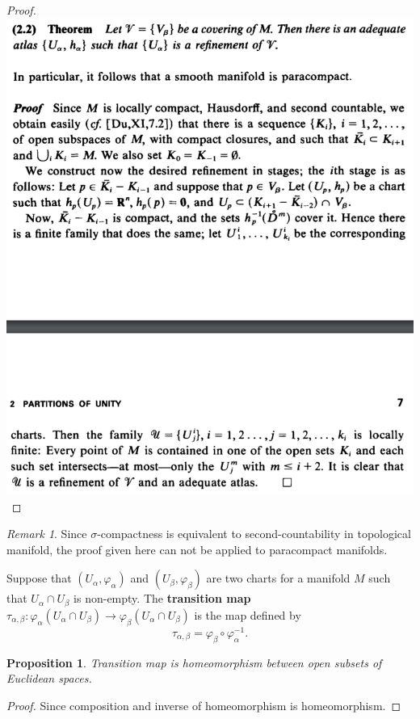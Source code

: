 \documentclass[12pt, letterpaper]{article}
\newtheorem{prop}{Proposition}[section]
\theoremstyle{definition}
\theoremstyle{remark}
\newtheorem*{rem*}{Remark}
\theoremstyle{definition}
\theoremstyle{plain}
\numberwithin{equation}{section}
\begin{document}
\begin{proof}
		\includegraphics[scale=0.65]{adequate_atlas}
	\end{proof}
	\begin{rem*}
		Since $\sigma$-compactness is equivalent to second-countability in topological manifold,
		the proof given here can not be applied to paracompact manifolds.
	\end{rem*}

	
	
	
	\begin{def*}
		Suppose that $(U_{\alpha },\varphi _{\alpha })$ and $(U_{\beta },\varphi _{\beta })$ are two charts for a manifold $M$ such that
		$U_{\alpha }\cap U_{\beta }$ is non-empty.
		The \textbf{transition map} $ \tau _{\alpha ,\beta }\colon\varphi _{\alpha }(U_{\alpha }\cap U_{\beta })\to \varphi _{\beta }(U_{\alpha }\cap U_{\beta })$
		is the map defined by
		\[\tau _{\alpha ,\beta }=\varphi _{\beta }\circ \varphi _{\alpha }^{-1}.\]
	\end{def*}
	\begin{prop}
		Transition map is homeomorphism between open subsets of Euclidean spaces.
	\end{prop}
	\begin{proof}
		Since composition and inverse of homeomorphism is homeomorphism.
	\end{proof}
\end{document}
